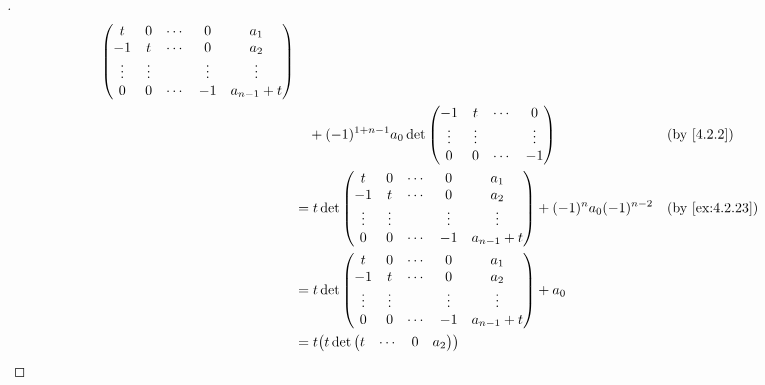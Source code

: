 \begin{proof}[]
\begin{align*}
\begin{pmatrix}
			           t      & 0      & \cdots & 0      & a_1           \\
			           -1     & t      & \cdots & 0      & a_2           \\
			           \vdots & \vdots &        & \vdots & \vdots        \\
			           0      & 0      & \cdots & -1     & a_{n - 1} + t
		           \end{pmatrix}                                                                      \\
		 & \quad + (-1)^{1 + n - 1} a_0 \det\begin{pmatrix}
			                                    -1     & t      & \cdots & 0      \\
			                                    \vdots & \vdots &        & \vdots \\
			                                    0      & 0      & \cdots & -1
		                                    \end{pmatrix}                                                &  & \by{4.2.2}                  \\
		 & = t \det\begin{pmatrix}
			           t      & 0      & \cdots & 0      & a_1           \\
			           -1     & t      & \cdots & 0      & a_2           \\
			           \vdots & \vdots &        & \vdots & \vdots        \\
			           0      & 0      & \cdots & -1     & a_{n - 1} + t
		           \end{pmatrix} + (-1)^n a_0 (-1)^{n - 2}                                            &  & \by{ex:4.2.23}                 \\
		 & = t \det\begin{pmatrix}
			           t      & 0      & \cdots & 0      & a_1           \\
			           -1     & t      & \cdots & 0      & a_2           \\
			           \vdots & \vdots &        & \vdots & \vdots        \\
			           0      & 0      & \cdots & -1     & a_{n - 1} + t
		           \end{pmatrix} + a_0                                                                      \\
		 & = t \pa{t \det\begin{pmatrix}
				                 t      & \cdots & 0      & a_2           \\

\end{pmatrix}}
\end{align*}
\end{proof}
